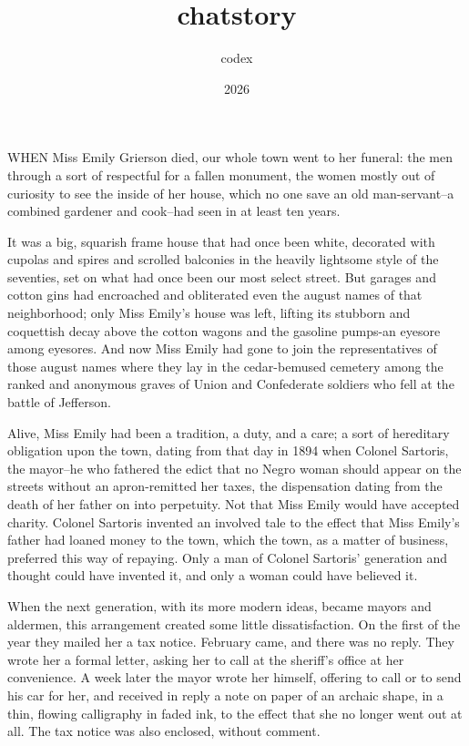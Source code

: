\documentclass[10pt,a4paper]{article}
\newcommand{\glos}[3]{\dotuline{#1}\marginpar{\scriptsize\textit{#3} #2}}
\begin{document}
\title{chatstory}
\date{2026}
\author{codex}
\maketitle
    
\thispagestyle{plain}
\setcounter{page}{1}
\linenumbers
WHEN Miss Emily Grierson died, our whole town went to her funeral: the men through a sort of respectful \glos{affection}{hengivelse}{subs.} for a fallen monument, the women mostly out of curiosity to see the inside of her house, which no one save an old man-servant--a combined gardener and cook--had seen in at least ten years.

It was a big, squarish frame house that had once been white, decorated with cupolas and spires and scrolled balconies in the heavily lightsome style of the seventies, set on what had once been our most select street. But garages and cotton gins had encroached and obliterated even the august names of that neighborhood; only Miss Emily's house was left, lifting its stubborn and coquettish decay above the cotton wagons and the gasoline pumps-an eyesore among eyesores. And now Miss Emily had gone to join the representatives of those august names where they lay in the cedar-bemused cemetery among the ranked and anonymous graves of Union and Confederate soldiers who fell at the battle of Jefferson.

Alive, Miss Emily had been a tradition, a duty, and a care; a sort of hereditary obligation upon the town, dating from that day in 1894 when Colonel Sartoris, the mayor--he who fathered the edict that no Negro woman should appear on the streets without an apron-remitted her taxes, the dispensation dating from the death of her father on into perpetuity. Not that Miss Emily would have accepted charity. Colonel Sartoris invented an involved tale to the effect that Miss Emily's father had loaned money to the town, which the town, as a matter of business, preferred this way of repaying. Only a man of Colonel Sartoris' generation and thought could have invented it, and only a woman could have believed it.

When the next generation, with its more modern ideas, became mayors and aldermen, this arrangement created some little dissatisfaction. On the first of the year they mailed her a tax notice. February came, and there was no reply. They wrote her a formal letter, asking her to call at the sheriff's office at her convenience. A week later the mayor wrote her himself, offering to call or to send his car for her, and received in reply a note on paper of an archaic shape, in a thin, flowing calligraphy in faded ink, to the effect that she no longer went out at all. The tax notice was also enclosed, without comment.
\end{document}
